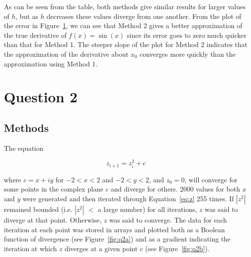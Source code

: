 \documentclass{article}
\begin{document}
\begin{figure}[!h]
    \label{fig:q1}
\end{figure}

As can be seen from the table, both methods give similar results for larger values of $h$, but as $h$ decreases these values diverge from one another.  From the plot of the error in Figure~\ref{fig:q1}, we can see that Method 2 gives a better approximation of the true derivative of $f(x)=\sin(x)$ since its error goes to zero much quicker than that for Method 1.  The steeper slope of the plot for Method 2 indicates that the approximation of the derivative about $x_0$ converges more quickly than the approximation using Method 1.

\section{Question 2}

\subsection{Methods}
The equation 

\begin{equation}
    z_{i+1}=z_i^2 + c
    \label{eq:z}
\end{equation}

where $c=x+iy$ for $-2<x<2$ and $-2<y<2$, and $z_0=0$, will converge for some points in the complex plane $c$ and diverge for others.  2000 values for both $x$ and $y$ were generated and then iterated through Equation~\ref{eq:z} 255 times.  If $|z^2|$ remained bounded (i.e. $|z^2|$ $<$ a large number) for all iterations, $z$ was said to diverge at that point.  Otherwise, $z$ was said to converge. The data for each iteration at each point was stored in arrays and plotted both as a Boolean function of divergence (see Figure~\ref{fig:q2a}) and as a gradient indicating the iteration at which $z$ diverges at a given point $c$ (see Figure~\ref{fig:q2b}).
\end{document}
